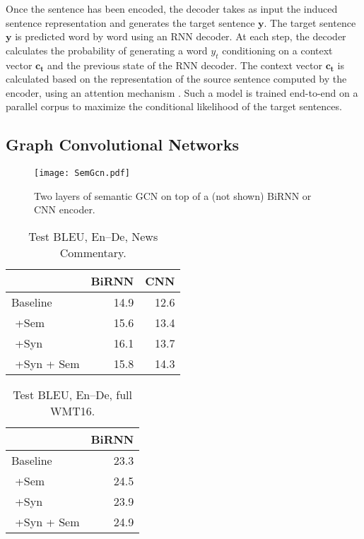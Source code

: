\documentclass[11pt,a4paper]{article}
\begin{document}
Once the sentence has been encoded, the decoder takes as input the induced sentence representation and generates the target sentence $\mathbf{y}$.
The target sentence $\mathbf{y}$ is predicted word by word using an RNN decoder. 
At each step, the decoder calculates the probability of generating a word $y_t$ conditioning on a context vector $\mathbf{c_t}$ and the previous state of the RNN decoder. 
The context vector $\mathbf{c_t}$ is calculated based on the representation of the source sentence computed by the encoder, using an attention mechanism \cite{bahdanau15iclr}. 
Such a model is trained end-to-end on a parallel corpus to maximize the conditional likelihood of the target sentences.



\subsection{Graph Convolutional Networks}
\begin{figure}
\begin{center}
\texttt{[image: SemGcn.pdf]}
\caption{ 
\label{fig:sem-gcn} Two layers of semantic GCN on top of a (not shown) BiRNN or CNN encoder.
} 
\end{center}
\end{figure}


\begin{table}[h]
\centering
\begin{tabular}{@{}lrr@{}} \toprule
 & BiRNN & CNN\\ 
\midrule
Baseline \small{\cite{bastings-EtAl:2017:EMNLP2017}}	& 14.9  &  12.6\\
\,\,+Sem	&  15.6 & 13.4\\
\,\,+Syn \small{\cite{bastings-EtAl:2017:EMNLP2017}} & 16.1 & 13.7 \\
\,\,+Syn + Sem	 & 15.8 & 14.3 \\
\bottomrule
\end{tabular}
\caption{Test BLEU, En--De, News Commentary.}
\label{tab:test-small}
\end{table}

\begin{table}[h]
\centering
\begin{tabular}{@{}lr@{}} \toprule
 & BiRNN  \\
\midrule
Baseline \small{\cite{bastings-EtAl:2017:EMNLP2017}}	& 23.3 \\ 
\,\,+Sem	&  24.5  \\  
\,\,+Syn \small{\cite{bastings-EtAl:2017:EMNLP2017}} & 23.9 \\ 
\,\,+Syn + Sem & 24.9 \\ 
\bottomrule
\end{tabular}
\caption{Test BLEU, En--De, full WMT16.}
\label{tab:test-full}
\end{table}
\end{document}
